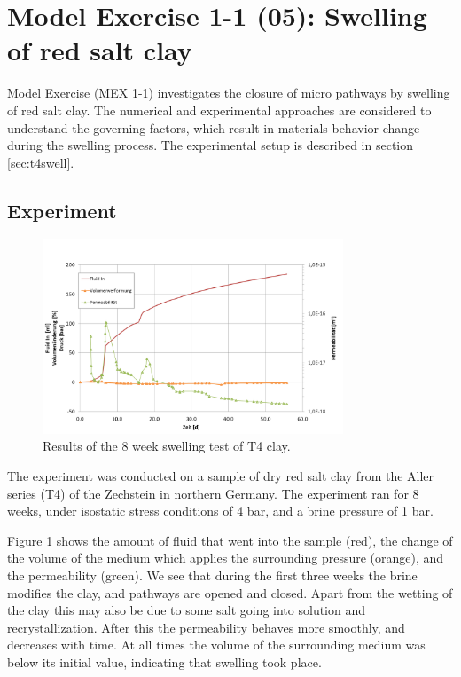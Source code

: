 \section{Model Exercise 1-1 (05): Swelling of red salt clay}
\label{sec:mex05}
Model Exercise (MEX 1-1) investigates the closure of micro pathways by swelling of red salt clay. The numerical and experimental approaches are considered to understand the governing factors, which result in materials behavior change during the swelling process. The experimental setup is described in section \ref{sec:t4swell}.

\subsection{Experiment}

\begin{figure}[ht]
\centering
\includegraphics[width=0.8\textwidth]{figures/IfG-T4-results.png}
\caption{Results of the 8 week swelling test of T4 clay.}
\label{fig:t4swellresults}
\end{figure}

The experiment was conducted on a sample of dry red salt clay from the Aller series (T4) of the Zechstein in northern Germany. The experiment ran for 8 weeks, under isostatic stress conditions of 4 bar, and a brine pressure of 1 bar. 

Figure \ref{fig:t4swellresults} shows the amount of fluid that went into the sample (red), the change of the volume of the medium which applies the surrounding pressure (orange), and the permeability (green). We see that during the first three weeks the brine modifies the clay, and pathways are opened and closed. Apart from the wetting of the clay this may also be due to some salt going into solution and recrystallization. After this the permeability behaves more smoothly, and decreases with time. At all times the volume of the surrounding medium was below its initial value, indicating that swelling took place. 

